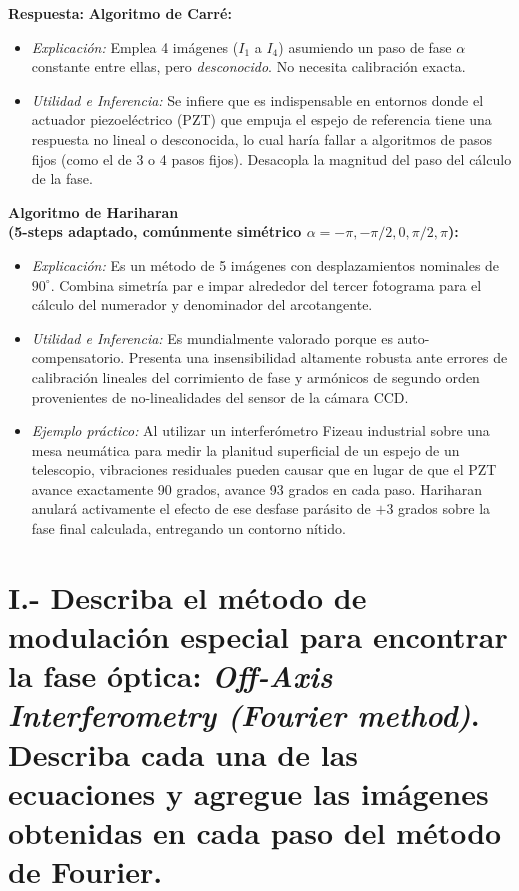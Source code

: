 \documentclass[12pt,letterpaper]{article}
\begin{document}
	\textbf{Respuesta:}
	\textbf{Algoritmo de Carré:}
	\begin{itemize}
		\item \textit{Explicación:} Emplea 4 imágenes ($I_1$ a $I_4$) asumiendo un paso de fase $\alpha$ constante entre ellas, pero \textit{desconocido}. No necesita calibración exacta.
		\item \textit{Utilidad e Inferencia:} Se infiere que es indispensable en entornos donde el actuador piezoeléctrico (PZT) que empuja el espejo de referencia tiene una respuesta no lineal o desconocida, lo cual haría fallar a algoritmos de pasos fijos (como el de 3 o 4 pasos fijos). Desacopla la magnitud del paso del cálculo de la fase.
	\end{itemize}
	
	\textbf{Algoritmo de Hariharan \\(5-steps adaptado, comúnmente simétrico $\alpha = -\pi, -\pi/2, 0, \pi/2, \pi$):}
	\begin{itemize}
		\item \textit{Explicación:} Es un método de 5 imágenes con desplazamientos nominales de $90^\circ$. Combina simetría par e impar alrededor del tercer fotograma para el cálculo del numerador y denominador del arcotangente.
		\item \textit{Utilidad e Inferencia:} Es mundialmente valorado porque es auto-compensatorio. Presenta una insensibilidad altamente robusta ante errores de calibración lineales del corrimiento de fase y armónicos de segundo orden provenientes de no-linealidades del sensor de la cámara CCD.
		\item \textit{Ejemplo práctico:} Al utilizar un interferómetro Fizeau industrial sobre una mesa neumática para medir la planitud superficial de un espejo de un telescopio, vibraciones residuales pueden causar que en lugar de que el PZT avance exactamente 90 grados, avance 93 grados en cada paso. Hariharan anulará activamente el efecto de ese desfase parásito de $+3$ grados sobre la fase final calculada, entregando un contorno nítido.
	\end{itemize}
	
	\newpage
	\section*{I.- Describa el método de modulación especial para encontrar la fase óptica: \textit{Off-Axis Interferometry (Fourier method)}. Describa cada una de las ecuaciones y agregue las imágenes obtenidas en cada paso del método de Fourier.}
	
\end{document}
